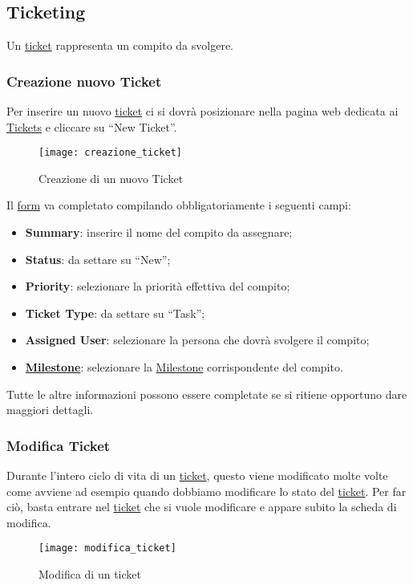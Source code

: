 \subsection{Ticketing}
Un \underline{ticket} rappresenta un compito da svolgere.

\subsubsection{Creazione nuovo Ticket}
\label{sec:creazione_ticket}
Per inserire un nuovo \underline{ticket} ci si dovrà posizionare nella pagina web dedicata ai \underline{Tickets} e cliccare su ``New Ticket''.
\begin{figure}[h]
\texttt{[image: creazione\_ticket]}
\caption{Creazione di un nuovo Ticket} \label{fig:creazione_ticket}
\end{figure}
Il \underline{form} va completato compilando obbligatoriamente i seguenti campi:
\begin{itemize}
\item \textbf{Summary}: inserire il nome del compito da assegnare;
\item \textbf{Status}: da settare su ``New'';
\item \textbf{Priority}: selezionare la priorità effettiva del compito;
\item \textbf{Ticket Type}: da settare su ``Task'';
\item \textbf{Assigned User}: selezionare la persona che dovrà svolgere il compito;
\item \textbf{\underline{Milestone}}: selezionare la \underline{Milestone} corrispondente del compito.
\end{itemize}
Tutte le altre informazioni possono essere completate se si ritiene opportuno dare maggiori dettagli.

\subsubsection{Modifica Ticket}
Durante l'intero ciclo di vita di un \underline{ticket}, questo viene modificato molte volte come avviene ad esempio quando dobbiamo modificare lo stato del \underline{ticket}. Per far ciò, basta entrare nel \underline{ticket} che si vuole modificare e appare subito la scheda di modifica.
\begin{figure}[h]
\texttt{[image: modifica\_ticket]}
\caption{Modifica di un ticket} \label{fig:modifica_ticket}
\end{figure}

